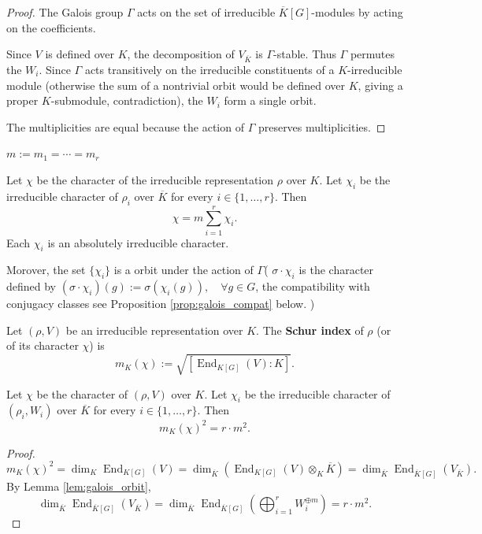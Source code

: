 \begin{proof}
The Galois group \(\Gamma \) acts on the set of irreducible \(\overline{K}[G]\)-modules by acting on the coefficients. 

Since \(V\) is defined over \(K\), the decomposition of \(V_{\overline{K}}\) is \(\Gamma\)-stable. Thus \(\Gamma\) permutes the \(W_i\). Since \(\Gamma\) acts transitively on the irreducible constituents of a \(K\)-irreducible module (otherwise the sum of a nontrivial orbit would be defined over \(K\), giving a proper \(K\)-submodule, contradiction),  the \(W_i\) form a single orbit.

The multiplicities are equal because the action of \(\Gamma\) preserves multiplicities.
\end{proof}

\begin{notation}
$m:=m_1=\cdots=m_r$
\end{notation}
\begin{remark}\label{rem:Decomposition of Scalars}
Let \(\chi\) be the character of the irreducible representation  $\rho$ over \(K\). Let \(\chi_i\) be the irreducible character of  \(\rho_i\) over \(\overline{K}\) for every $i\in\{1,\dots,r\}$. Then
\[
\chi = m\sum_{i=1}^r \chi_i.
\]
Each \(\chi_i\) is an absolutely irreducible character.

Morover, the set \(\{\chi_i\}\) is a orbit under the action of  $\Gamma$( \(\sigma \cdot \chi_i\) is the character defined by \((\sigma \cdot \chi_i)(g) := \sigma(\chi_i(g)),\quad\forall g\in G\), the compatibility with conjugacy classes see Proposition \ref{prop:galois_compat} below. )
\end{remark}

\begin{defn}
Let \((\rho,V)\) be an irreducible representation over \(K\). The \textbf{Schur index} of \(\rho\) (or of its character \(\chi\)) is
\[
m_K(\chi) := \sqrt{[\operatorname{End}_{K[G]}(V) : K]}.\]
\end{defn}

\begin{lemma}\label{lem:schur_index_and_galois}
Let \(\chi\) be the character of $(\rho,V)$ over \(K\). Let \(\chi_i\) be the irreducible character of  \((\rho_i,W_i)\) over \(\overline{K}\) for every $i\in\{1,\dots,r\}$. Then
\[
m_K(\chi)^2=r\cdot m^2.
\]
\end{lemma}

\begin{proof}
\[m_K(\chi)^2
= \dim_K \operatorname{End}_{K[G]}(V)
= \dim_{\overline{K}}(\operatorname{End}_{K[G]}(V) \otimes_K \overline{K})
= \dim_{\overline{K}} \operatorname{End}_{\overline{K}[G]}(V_{\overline{K}})
.\]
By Lemma  \ref{lem:galois_orbit}, \[\dim_{\overline{K}} \operatorname{End}_{\overline{K}[G]}(V_{\overline{K}})=\dim_{\overline{K}} \operatorname{End}_{\overline{K}[G]}(\bigoplus_{i=1}^r W_i^{\oplus m})= r \cdot m^2.\]
\end{proof}

